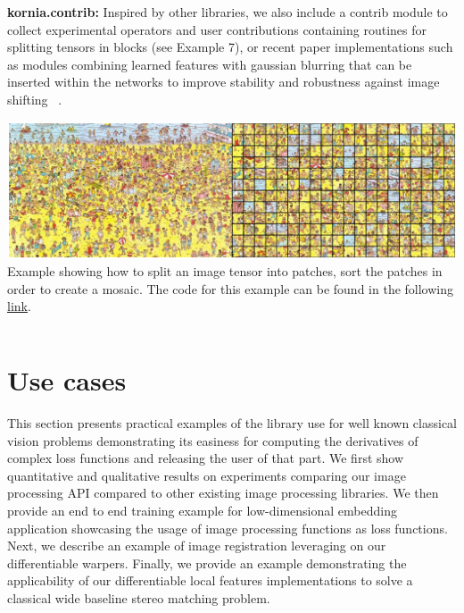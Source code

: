\noindent\textbf{kornia.contrib:} Inspired by other libraries, we also include a  contrib module  to collect experimental operators and user contributions containing routines for splitting tensors in blocks (see Example 7), or recent paper implementations such as modules combining learned features with gaussian blurring that can be inserted within the networks to improve stability and robustness against image shifting ~\citep{zhang2019shiftinvar}.

\begin{tcolorbox}[every float=\centering, drop shadow, title=Example 7: Extract image patches]
    \label{fig:examples:contrib}
    \includegraphics[width=1.\linewidth]{main/chapter03/data/examples/wally_patches.jpg}
    {Example showing how to split an image tensor into patches, sort the patches in order to create a mosaic. The code for this example can be found in the following \underline{\color{blue}\href{https://colab.research.google.com/drive/1JEPVShMILiFd4VfbJ5P3qTrqajSfR0Xv}{link}}.}
    \inputminted[python3, baselinestretch=1., style=vs, fontfamily=courier, fontsize=\footnotesize, funcnamehighlighting=true]{python}{main/chapter03/data/examples/snipet_contrib.py}
\end{tcolorbox}

\section{Use cases}
\label{section:use_cases}
%
This section presents practical examples of the library use for well known classical vision problems demonstrating its easiness for computing the derivatives of complex loss functions and releasing the user of that part. We first show quantitative and qualitative results on experiments comparing our image processing API compared to other existing image processing libraries. We then provide an end to end training example for low-dimensional embedding application showcasing the usage of image processing functions as loss functions. Next, we describe an example of image registration leveraging on our differentiable warpers. Finally, we provide an example demonstrating the applicability of  our differentiable local features implementations to solve a classical wide baseline stereo matching problem.

